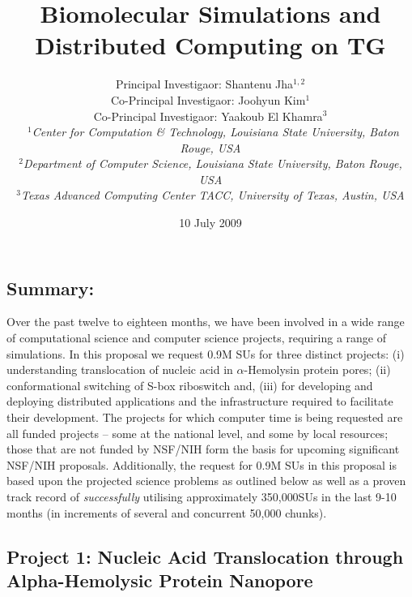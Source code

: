 \documentclass[a4paper,10pt]{article}
\begin{document}
\title{\large Biomolecular Simulations and Distributed Computing on TG}

\author{Principal Investigaor: Shantenu Jha$^{1,2}$ \\ Co-Principal Investigaor: Joohyun Kim$^{1}$ \\ Co-Principal Investigaor: Yaakoub El Khamra$^{3}$\\\
   \small{\emph{$^{1}$Center for Computation \& Technology, Louisiana State University, Baton Rouge, 
USA}}
\\
  \small{\emph{$^{2}$Department of Computer Science, Louisiana State
      University, Baton Rouge, USA}}
\\
  \small{\emph{$^{3}$Texas Advanced Computing Center TACC, University of Texas, Austin, USA}}}



\date{10 July 2009}

\maketitle

\subsection*{Summary:} Over the past twelve to eighteen months, we have been involved in a wide 
range of computational science and computer science projects, requiring a range of simulations.
In this proposal we request 0.9M SUs for three distinct projects:
(i) understanding translocation of nucleic acid in $\alpha$-Hemolysin protein pores; (ii)
conformational switching of S-box riboswitch and, (iii) for developing and 
deploying distributed applications and the infrastructure required to facilitate
their development. 
The projects for which computer time is being requested are all funded projects -- some at the national level, and some
by local resources; those that are not funded by NSF/NIH form the basis for upcoming significant
NSF/NIH proposals. 
Additionally, the request for 0.9M SUs in this proposal 
is based upon the projected science problems as outlined below as well as a proven
track record of
{\it successfully} utilising approximately 350,000SUs in the last 9-10 months (in increments
of several and concurrent 50,000 chunks).

\subsection*{Project 1: Nucleic Acid Translocation through Alpha-Hemolysic Protein Nanopore}
\end{document}
